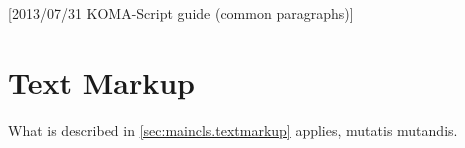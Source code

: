 %
%
%
%
%
%
%
%
% 
%
%
%
%

[2013/07/31 KOMA-Script guide (common paragraphs)]


\makeatletter
{}%
%
%
%
\makeatother


\section{Text Markup}
\label{sec:\csname label@base\endcsname.textmarkup}%
\IgnoreThisfalse
\ifshortversion\IgnoreThistrue\ifCommonmaincls\IgnoreThisfalse\fi\fi%
\ifIgnoreThis %
What is described in
\autoref{sec:maincls.textmarkup} applies, mutatis mutandis.
\else %
%
%

